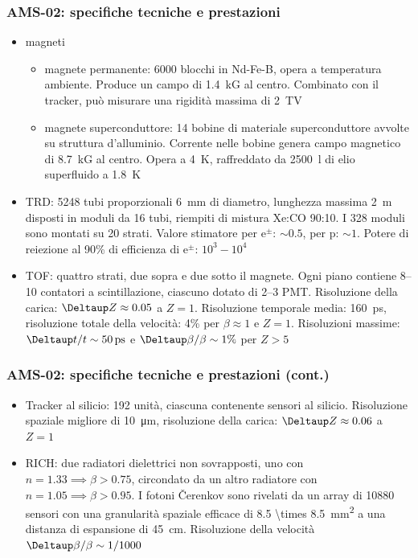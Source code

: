 \documentclass[10pt]{beamer}
\begin{document}
\begin{frame}
  \frametitle{AMS-02: specifiche tecniche e prestazioni}
  \begin{itemize}
  \item magneti
    \begin{itemize}
    \item magnete permanente: 6000 blocchi in Nd-Fe-B, opera a temperatura
      ambiente.  Produce un campo di \SI{1.4}{\kilo G} al centro.  Combinato con
      il tracker, può misurare una rigidità massima di \SI{2}{\tera\volt}
    \item magnete superconduttore: 14 bobine di materiale superconduttore
      avvolte su struttura d'alluminio.  Corrente nelle bobine genera campo
      magnetico di \SI{8.7}{\kilo G} al centro.  Opera a \SI{4}{\kelvin},
      raffreddato da \SI{2500}{\litre} di elio superfluido a \SI{1.8}{\kelvin}
    \end{itemize}
  \item TRD: 5248 tubi proporzionali \SI{6}{\milli\metre} di diametro, lunghezza
    massima \SI{2}{\metre} disposti in moduli da 16 tubi, riempiti di mistura
    Xe:CO 90:10.  I 328 moduli sono montati su 20 strati.  Valore
    stimatore per e$^{\pm}$: $\sim 0.5$, per p: $\sim 1$.  Potere di reiezione
    al 90\% di efficienza di e$^{\pm}$: $10^{3}-10^{4}$
  \item TOF: quattro strati, due sopra e due sotto il magnete.  Ogni piano
    contiene 8--10 contatori a scintillazione, ciascuno dotato di 2--3 PMT.
    Risoluzione della carica: $\Deltaup Z \approx 0.05$ a $Z = 1$.  Risoluzione
    temporale media: \SI{160}{\pico\second}, risoluzione totale della velocità:
    4\% per $\beta \approx 1$ e $Z = 1$.  Risoluzioni massime:
    $\Deltaup t/t \sim \SI{50}{\pico\second}$ e $\Deltaup \beta/\beta \sim 1\%$
    per $Z > 5$
  \end{itemize}
\end{frame}

\begin{frame}
  \frametitle{AMS-02: specifiche tecniche e prestazioni (cont.)}
  \begin{itemize}
  \item Tracker al silicio: 192 unità, ciascuna contenente sensori al
    silicio.  Risoluzione spaziale migliore di \SI{10}{\micro\metre},
    risoluzione della carica: $\Deltaup Z \approx 0.06$ a $Z = 1$
  \item RICH: due radiatori dielettrici non sovrapposti, uno con
    $n = 1.33 \implies \beta > 0.75$, circondato da un altro radiatore con
    $n = 1.05 \implies \beta > 0.95$.  I fotoni Čerenkov sono rivelati da un
    array di \num{10880} sensori con una granularità spaziale efficace di
    \SI[parse-numbers=false]{8.5 \times 8.5}{\milli\metre\squared} a una
    distanza di espansione di \SI{45}{\centi\metre}.  Risoluzione della velocità
    $\Deltaup \beta/\beta \sim 1/1000$
  \end{itemize}
\end{frame}
\end{document}
